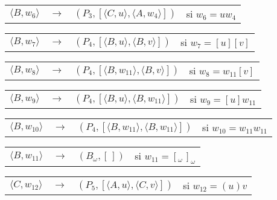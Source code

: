 \begin{table}
\begin{flushleft}
\begin{tabular}[t]{lcp{5.3cm}l}
	\end{tabular}
	\begin{tabular}[t]{lcp{5.3cm}l}
	
	$\langle B,w_{6} \rangle$ & $\longrightarrow$ & $(P_{3}, [\langle C,u \rangle, \langle A,w_{4} \rangle])$ & si $w_{6}=uw_{4}$ \\
	
	\end{tabular}
	\begin{tabular}[t]{lcp{5.3cm}l}
	
	$\langle B,w_{7} \rangle$ & $\longrightarrow$ & $(P_{4}, [\langle B,u \rangle, \langle B,v \rangle])$ & si $w_{7}=[u][v]$\\
	
	\end{tabular}
	\begin{tabular}[t]{lcp{5.3cm}l}
	
	$\langle B,w_{8} \rangle$ & $\longrightarrow$ & $(P_{4}, [\langle B,w_{11} \rangle, \langle B,v \rangle])$ & si $w_{8}=w_{11}[v]$\\
	
	\end{tabular}
	\begin{tabular}[t]{lcp{5.3cm}l}
	
	$\langle B,w_{9} \rangle$ & $\longrightarrow$ & $(P_{4}, [\langle B,u \rangle, \langle B,w_{11} \rangle])$ & si $w_{9}=[u]w_{11}$\\
	
	\end{tabular}
	\begin{tabular}[t]{lcp{5.3cm}l}
	
	$\langle B,w_{10} \rangle$ & $\longrightarrow$ & $(P_{4}, [\langle B,w_{11} \rangle, \langle B,w_{11} \rangle])$ & si $w_{10}=w_{11}w_{11}$\\
	
	\end{tabular}
	\begin{tabular}[t]{lcp{5.3cm}l}
	
	$\langle B,w_{11} \rangle$ & $\longrightarrow$ & $(B_{\omega}, [\,])$ & si $w_{11}=[_{\omega}\, ]_{\omega}$\\
	
	\end{tabular}
	\begin{tabular}[t]{lcp{5.3cm}l}
	
	$\langle C,w_{12} \rangle$ & $\longrightarrow$ & $(P_{5}, [\langle A,u \rangle, \langle C,v \rangle])$ & si $w_{12}=(u)v$ \\
	

\end{tabular}
\end{flushleft}
\end{table}
